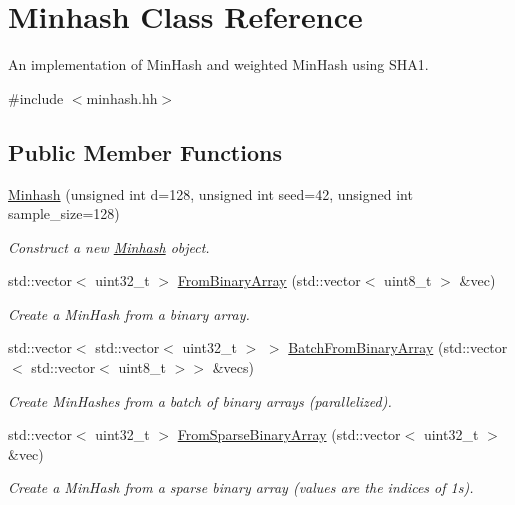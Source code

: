 \hypertarget{classMinhash}{}\section{Minhash Class Reference}
\label{classMinhash}


An implementation of Min\+Hash and weighted Min\+Hash using S\+H\+A1.  




{\ttfamily \#include $<$minhash.\+hh$>$}

\subsection*{Public Member Functions}
\begin{DoxyCompactItemize}
\item 
\hyperlink{classMinhash_ad07fccee7e95ca368e5fabfb0ee76804}{Minhash} (unsigned int d=128, unsigned int seed=42, unsigned int sample\+\_\+size=128)
\begin{DoxyCompactList}\small\item\em Construct a new \hyperlink{classMinhash}{Minhash} object. \end{DoxyCompactList}\item 
std\+::vector$<$ uint32\+\_\+t $>$ \hyperlink{classMinhash_ae47faddc57a5d503257e6cf88dba2e08}{From\+Binary\+Array} (std\+::vector$<$ uint8\+\_\+t $>$ \&vec)
\begin{DoxyCompactList}\small\item\em Create a Min\+Hash from a binary array. \end{DoxyCompactList}\item 
std\+::vector$<$ std\+::vector$<$ uint32\+\_\+t $>$ $>$ \hyperlink{classMinhash_a232f4fd24fcc853934599b666cbfc3be}{Batch\+From\+Binary\+Array} (std\+::vector$<$ std\+::vector$<$ uint8\+\_\+t $>$$>$ \&vecs)
\begin{DoxyCompactList}\small\item\em Create Min\+Hashes from a batch of binary arrays (parallelized). \end{DoxyCompactList}\item 
std\+::vector$<$ uint32\+\_\+t $>$ \hyperlink{classMinhash_afe2cf6cc64b2e97ce89db4087febf30f}{From\+Sparse\+Binary\+Array} (std\+::vector$<$ uint32\+\_\+t $>$ \&vec)
\begin{DoxyCompactList}\small\item\em Create a Min\+Hash from a sparse binary array (values are the indices of 1s). \end{DoxyCompactList}\item 
$$
\end{DoxyCompactItemize}
